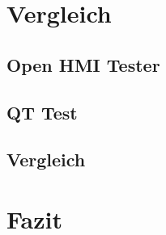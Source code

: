 \chapter{Vergleich}

	\section{Open HMI Tester}
	\section{QT Test}
	\section{Vergleich}

\chapter{Fazit}
%			

	